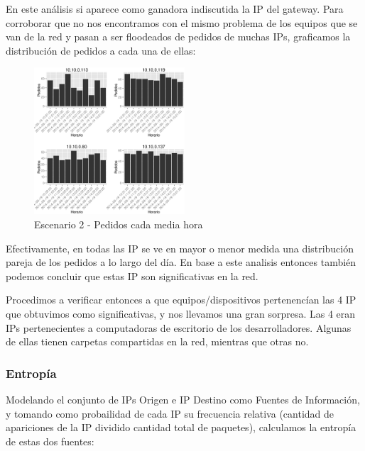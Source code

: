     \par En este análisis si aparece como ganadora indiscutida la IP del gateway. Para corroborar que no nos encontramos con el mismo problema de los equipos que se van de la red y pasan a ser floodeados de pedidos de muchas IPs, graficamos la distribución de pedidos a cada una de ellas:
    \begin{figure}[!htb]
		\centering
		\includegraphics[width=0.5\textwidth]{img/graph/escenario_2/distribucionHoraria4IPsMasPedidas.eps}
		\caption{Escenario 2 - Pedidos cada media hora}
		\label{fig:escenario2_distribucionHoraria4IPsMasPedidas}
	\end{figure}
    \par Efectivamente, en todas las IP se ve en mayor o menor medida una distribución pareja de los pedidos a lo largo del día. En base a este analisis entonces también podemos concluir que estas IP son significativas en la red.
    
    \par Procedimos a verificar entonces a que equipos/dispositivos pertenencían las 4 IP que obtuvimos como significativas, y nos llevamos una gran sorpresa. Las 4 eran IPs pertenecientes a computadoras de escritorio de los desarrolladores. Algunas de ellas tienen carpetas compartidas en la red, mientras que otras no.
    
\subsubsection{Entrop\'ia}
	\par Modelando el conjunto de IPs Origen e IP Destino como Fuentes de Información, y tomando como probailidad de cada IP su frecuencia relativa (cantidad de apariciones de la IP dividido cantidad total de paquetes), calculamos la entropía de estas dos fuentes:
    
